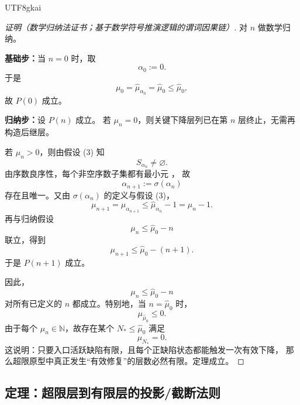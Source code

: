 \documentclass[12pt]{article}
\newcommand{\NN}{\mathbb{N}}
\begin{document}
\begin{CJK*}{UTF8}{gkai}
\begin{proof}[证明（数学归纳法证书；基于数学符号推演逻辑的谓词因果链）]
对 $n$ 做数学归纳。

\textbf{基础步：}当 $n=0$ 时，取
\[
  \alpha_0:=0.
\]
于是
\[
  \mu_0
  =
  \widehat\mu_{\alpha_0}
  =
  \widehat\mu_0
  \le
  \widehat\mu_0,
\]
故 $P(0)$ 成立。

\textbf{归纳步：}设 $P(n)$ 成立。
若 $\mu_n=0$，则关键下降层列已在第 $n$ 层终止，无需再构造后继层。

若 $\mu_n>0$，则由假设 (3) 知
\[
  S_{\alpha_n}\neq\varnothing.
\]
由序数良序性，每个非空序数子集都有最小元
\cite{RepoTex29TransfiniteRepair,Jech2003SetTheory,Kunen2011SetTheory}，
故
\[
  \alpha_{n+1}:=\sigma(\alpha_n)
\]
存在且唯一。又由 $\sigma(\alpha_n)$ 的定义与假设 (3)，
\[
  \mu_{n+1}
  =
  \widehat\mu_{\alpha_{n+1}}
  \le
  \widehat\mu_{\alpha_n}-1
  =
  \mu_n-1.
\]
再与归纳假设
\[
  \mu_n\le \widehat\mu_0-n
\]
联立，得到
\[
  \mu_{n+1}
  \le
  \widehat\mu_0-(n+1).
\]
于是 $P(n+1)$ 成立。

因此，
\[
  \mu_n\le \widehat\mu_0-n
\]
对所有已定义的 $n$ 都成立。特别地，当 $n=\widehat\mu_0$ 时，
\[
  \mu_{\widehat\mu_0}\le 0.
\]
由于每个 $\mu_n\in\NN$，故存在某个 $N_\ast\le \widehat\mu_0$ 满足
\[
  \mu_{N_\ast}=0.
\]
这说明：只要入口活跃缺陷有限，且每个正缺陷状态都能触发一次有效下降，
那么超限原型中真正发生“有效修复”的层数必然有限。定理成立。
\end{proof}

\subsection{定理：超限层到有限层的投影/截断法则}
\label{subsec:tex38-ch4-theorem}


\end{CJK*}
\end{document}
